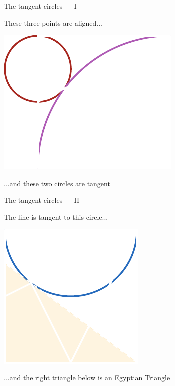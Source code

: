 \documentclass[14pt]{beamer}
\begin{document}

    \begin{frame}{The tangent circles --- I}
        \begin{center}
            These three points are aligned...
        \end{center}
        \hspace{3.92em} \includegraphics[scale=1.0]{figures/figure019d.pdf} \\
        \begin{center}
             ...and these two circles are tangent
        \end{center}
    \end{frame}


    \begin{frame}{The tangent circles --- II}
        \begin{center}
            The line is tangent to this circle...
        \end{center}
        \hspace{6.18em} \includegraphics[scale=1.0]{figures/figure019e.pdf} \\
        \begin{center}
             ...and the right triangle below is an Egyptian Triangle
        \end{center}
    \end{frame}
\end{document}
